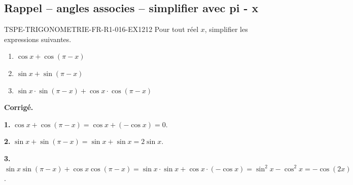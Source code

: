 

\subsection*{Rappel -- angles associes -- simplifier avec pi - x}

\begin{exercice}{TSPE-TRIGONOMETRIE-FR-R1-016-EX1}{2}{12}
Pour tout réel $x$, simplifier les expressions suivantes.
\begin{enumerate}
  \item $\cos x + \cos(\pi - x)$
  \item $\sin x + \sin(\pi - x)$
  \item $\sin x \cdot \sin(\pi - x) + \cos x \cdot \cos(\pi - x)$
\end{enumerate}
\end{exercice}

\medskip
\noindent\textbf{Corrigé.}

\textbf{1.} $\cos x + \cos(\pi-x) = \cos x + (-\cos x) = 0$.

\textbf{2.} $\sin x + \sin(\pi-x) = \sin x + \sin x = 2\sin x$.

\textbf{3.} $\sin x \sin(\pi-x) + \cos x \cos(\pi-x) = \sin x \cdot \sin x + \cos x \cdot (-\cos x) = \sin^2 x - \cos^2 x = -\cos(2x)$.
